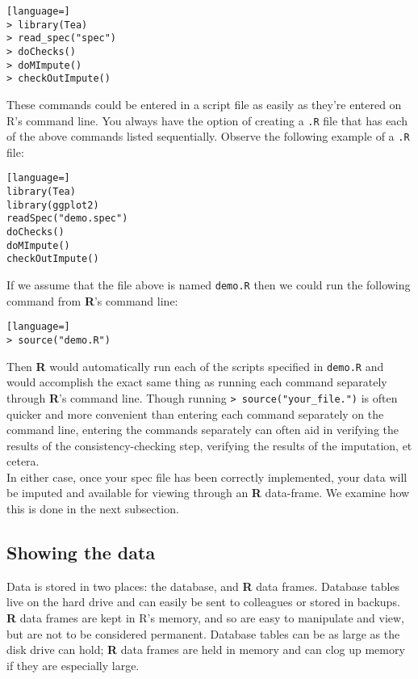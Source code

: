 \documentclass{article}
\begin{document}
\begin{lstlisting}[language=]
> library(Tea)
> read_spec("spec")
> doChecks()
> doMImpute()
> checkOutImpute()
\end{lstlisting}

These commands could be entered in a script file as easily as they're entered on R's command line.
You always have the option of creating a {\tt .R} file that has each of the above commands listed 
sequentially. Observe the following example of a {\tt .R} file:

\begin{lstlisting}[language=]
library(Tea)
library(ggplot2)
readSpec("demo.spec")
doChecks()
doMImpute()
checkOutImpute()
\end{lstlisting}

If we assume that the file above is named {\tt demo.R} then we could run the following command 
from \textbf{R}'s command line:

\begin{lstlisting}[language=]
> source("demo.R")
\end{lstlisting}

Then \textbf{R} would automatically run each of the scripts specified in {\tt demo.R} and would 
accomplish the exact same thing as running each command separately through \textbf{R}'s command line.
Though running {\tt > source("your\_file.")} is often quicker and more convenient than entering 
each command separately on the command line, entering the commands separately can often aid in 
verifying the results of the consistency-checking step, verifying the results of the imputation, 
et cetera.\\

In either case, once your spec file has been correctly implemented, your data will be 
imputed and available for viewing through an \textbf{R} data-frame.
We examine how this is done in the next subsection.

\subsection{Showing the data}
Data is stored in two places: the database, and \textbf{R} data frames. Database tables
live on the hard drive and can easily be sent to colleagues or stored in
backups. \textbf{R} data frames are kept in R's memory, and so are easy to manipulate and
view, but are not to be considered permanent. Database tables can be as large as
the disk drive can hold; \textbf{R} data frames are held in memory and can clog up memory if
they are especially large.
\end{document}
